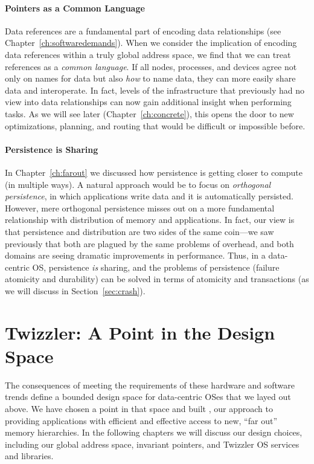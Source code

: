 \paragraph{Pointers as a Common Language} Data references are a fundamental part of encoding data relationships (see
Chapter~\ref{ch:softwaredemands}). When we consider the implication of encoding data references within a truly global
address space, we find that we can treat references as a \emph{common language}. If all nodes, processes, and devices
agree not only on names for data but also \emph{how} to name data, they can more easily share data and interoperate. In
fact, levels of the infrastructure that previously had no view into data relationships can now gain additional insight
when performing tasks. As we will see later (Chapter~\ref{ch:concrete}), this opens the door to new optimizations, planning, and routing that would
be difficult or impossible before.


\paragraph{Persistence is Sharing} In Chapter~\ref{ch:farout} we discussed how persistence is getting closer to compute
(in multiple ways). A natural approach would be to focus on \emph{orthogonal persistence}, in which applications write
data and it is automatically persisted. However, mere orthogonal persistence misses out on a more fundamental
relationship with distribution of memory and applications. In fact, our view is that persistence and distribution are
two sides of the same coin---we saw previously that both are plagued by the same problems of overhead, and both domains
are seeing dramatic improvements in performance. Thus, in a data-centric OS, persistence \emph{is} sharing, and the
problems of persistence (\eg failure atomicity and durability) can be solved in terms of atomicity and transactions (as
we will discuss in Section~\ref{sec:crash}).

\section{Twizzler: A Point in the Design Space}

The consequences of meeting the requirements of these hardware and software trends
define a bounded design space for data-centric OSes that we layed out above. We have
chosen a point in that space and built \Twizzler, our approach to providing
applications with efficient and effective access to new, ``far out'' memory hierarchies. In the
following chapters we will discuss our design choices, including our global address space, invariant pointers, and
Twizzler OS services and libraries.

